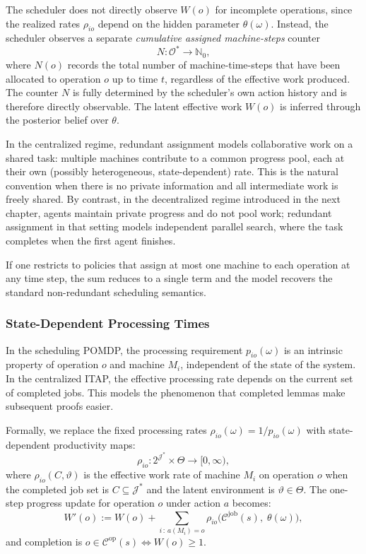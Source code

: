 The scheduler does not directly observe $W(o)$ for incomplete operations, since the
realized rates $\rho_{io}$ depend on the hidden parameter $\theta(\omega)$. Instead,
the scheduler observes a separate \emph{cumulative assigned machine-steps} counter
\[
N : \mathcal{O}^* \to \mathbb{N}_0,
\]
where $N(o)$ records the total number of machine-time-steps that have been allocated
to operation $o$ up to time $t$, regardless of the effective work produced. The
counter $N$ is fully determined by the scheduler's own action history and is therefore
directly observable. The latent effective work $W(o)$ is inferred through the
posterior belief over $\theta$.

\begin{remark}
In the centralized regime, redundant assignment models collaborative work on a shared
task: multiple machines contribute to a common progress pool, each at their own
(possibly heterogeneous, state-dependent) rate. This is the natural convention when
there is no private information and all intermediate work is freely shared. By
contrast, in the decentralized regime introduced in the next chapter, agents maintain
private progress and do not pool work; redundant assignment in that setting models
independent parallel search, where the task completes when the first agent finishes.
\end{remark}

\begin{remark}
If one restricts to policies that assign at most one machine to each operation at any
time step, the sum reduces to a single term and the model recovers the standard
non-redundant scheduling semantics.
\end{remark}

\subsubsection{State-Dependent Processing Times}

In the scheduling POMDP, the processing requirement $p_{io}(\omega)$ is an intrinsic
property of operation $o$ and machine $M_i$, independent of the state of the system.
In the centralized ITAP, the effective processing rate depends on the current set of
completed jobs. This models the phenomenon that completed lemmas make subsequent
proofs easier.

Formally, we replace the fixed processing rates $\rho_{io}(\omega) = 1/p_{io}(\omega)$
with state-dependent productivity maps:
\[
\rho_{io} : 2^{\mathcal{J}^*} \times \Theta \to [0, \infty),
\]
where $\rho_{io}(C, \vartheta)$ is the effective work rate of machine $M_i$ on
operation $o$ when the completed job set is $C \subseteq \mathcal{J}^*$ and the latent
environment is $\vartheta \in \Theta$. The one-step progress update for operation $o$
under action $a$ becomes:
\[
W'(o) := W(o) + \sum_{i\,:\, a(M_i) = o}
\rho_{io}\bigl(\mathcal{C}^{\mathrm{job}}(s),\; \theta(\omega)\bigr),
\]
and completion is
$o \in \mathcal{C}^{\mathrm{op}}(s) \iff W(o) \ge 1$.


